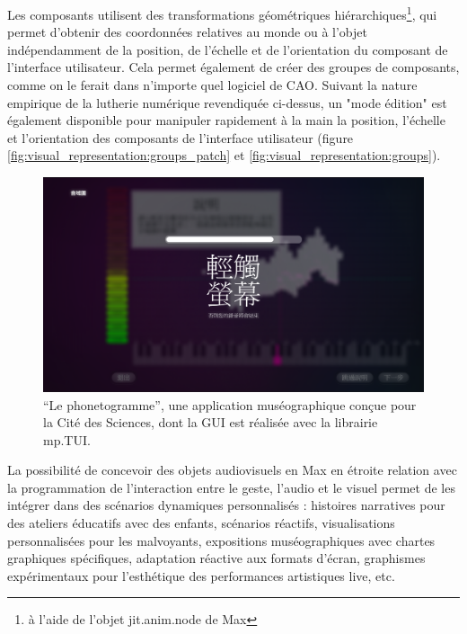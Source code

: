 Les composants utilisent des transformations géométriques hiérarchiques\footnote{à l'aide de l'objet jit.anim.node de Max}, qui permet d'obtenir des coordonnées relatives au monde ou à l'objet indépendamment de la position, de l'échelle et de l'orientation du composant de l'interface utilisateur. Cela permet également de créer des groupes de composants, comme on le ferait dans n'importe quel logiciel de CAO. Suivant la nature empirique de la lutherie numérique revendiquée ci-dessus, un "mode édition" est également disponible pour manipuler rapidement à la main la position, l'échelle et l'orientation des composants de l'interface utilisateur (figure \ref{fig:visual_representation:groups_patch} et \ref{fig:visual_representation:groups}).

\begin{figure}[!htbp]
	\includegraphics[width=\textwidth]{gfx/06_visual_representation/Phonetogramme.png}
	\caption{``Le phonetogramme'', une application muséographique conçue pour la Cité des Sciences, dont la GUI est réalisée avec la librairie mp.TUI.}
	\label{fig:visual_representation:phonetogramme}
\end{figure}

La possibilité de concevoir des objets audiovisuels en Max en étroite relation avec la programmation de l'interaction entre le geste, l'audio et le visuel permet de les intégrer dans des scénarios dynamiques personnalisés : histoires narratives pour des ateliers éducatifs avec des enfants, scénarios réactifs, visualisations personnalisées pour les malvoyants, expositions muséographiques avec chartes graphiques spécifiques, adaptation réactive aux formats d'écran, graphismes expérimentaux pour l'esthétique des performances artistiques live, etc.


